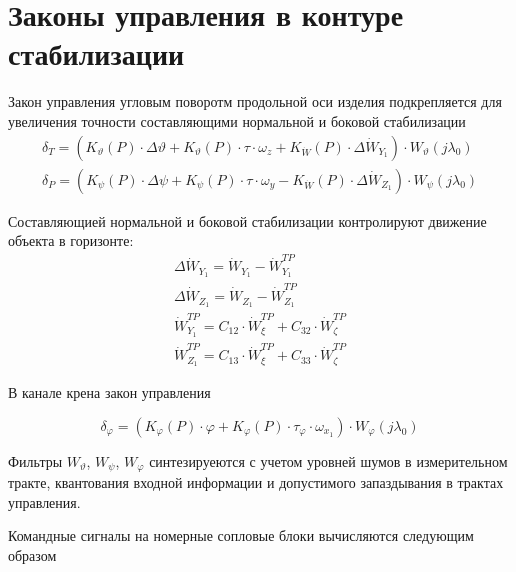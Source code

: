 \section{Законы управления в контуре стабилизации}
Закон управления угловым поворотм продольной оси изделия подкрепляется для увеличения точности составляющими нормальной и боковой стабилизации
\begin{equation}
	\begin{gathered}
		\delta_T = \left( K_\vartheta (P) \cdot \Delta \vartheta + K_\vartheta (P) \cdot \tau \cdot \omega_z + K_{\dot{W}} (P) \cdot \Delta \dot{W}_{Y_1} \right) \cdot W_{\vartheta} (j \lambda_0) \\
		\delta_P = \left( K_\psi (P) \cdot \Delta \psi + K_\psi (P) \cdot \tau \cdot \omega_y - K_{\dot{W}} (P) \cdot \Delta \dot{W}_{Z_1} \right) \cdot W_{\psi} (j \lambda_0)		
	\end{gathered}
\end{equation}

Составляющией нормальной и боковой стабилизации контролируют движение объекта в горизонте:
\begin{equation}
	\begin{gathered}
		\Delta \dot{W}_{Y_1} = \dot{W}_{Y_1} - \dot{W}_{Y_1}^{TP} \\
		\Delta \dot{W}_{Z_1} = \dot{W}_{Z_1} - \dot{W}_{Z_1}^{TP}  \\
		\dot{W}_{Y_1}^{TP} = C_{12} \cdot \dot{W}_{\xi}^{TP} + C_{32} \cdot \dot{W}_{\zeta}^{TP} \\
		\dot{W}_{Z_1}^{TP} = C_{13} \cdot \dot{W}_{\xi}^{TP} + C_{33} \cdot \dot{W}_{\zeta}^{TP}
	\end{gathered}
\end{equation}

В канале крена закон управления

\begin{equation}
	\delta_\varphi = \left( K_\varphi (P) \cdot \varphi + K_\varphi (P) \cdot \tau_\varphi \cdot \omega_{x_1} \right) \cdot W_\varphi (j\lambda_0)
\end{equation}

Фильтры $W_\vartheta$, $W_\psi$, $W_\varphi$ синтезируеются с учетом уровней шумов в измерительном тракте, квантования входной информации и допустимого запаздывания в трактах управления.

Командные сигналы на номерные сопловые блоки вычисляются следующим образом

